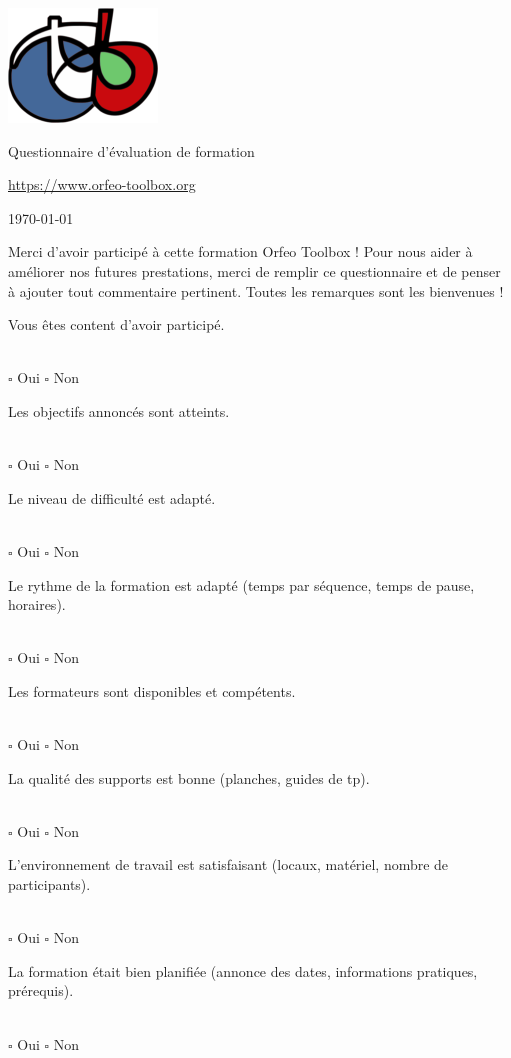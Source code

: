 \documentclass[10pt,a4paper]{article}
\begin{document}
\begin{center}
\includegraphics[scale=0.5]{Art/otb-logo.png}

Questionnaire d'évaluation de formation

{\small\url{https://www.orfeo-toolbox.org}}

\today
\end{center}

\begin{center}
\begin{minipage}{.8\textwidth}
Merci d'avoir participé à cette formation Orfeo Toolbox ! Pour nous aider à
améliorer nos futures prestations, merci de remplir ce questionnaire et de
penser à ajouter tout commentaire pertinent. Toutes les remarques sont les
bienvenues !
\end{minipage}
\end{center}

\newcommand{\answer}{
\\ \quad $\square$ Oui \quad $\square$ Non\\
\vspace{4em}
}

Vous êtes content d'avoir participé.
\answer

Les objectifs annoncés sont atteints.
\answer

Le niveau de difficulté est adapté.
\answer

Le rythme de la formation est adapté (temps par séquence, temps de pause,
horaires).
\answer

Les formateurs sont disponibles et compétents.
\answer

La qualité des supports est bonne (planches, guides de tp).
\answer

L'environnement de travail est satisfaisant (locaux, matériel, nombre de
participants).
\answer

La formation était bien planifiée (annonce des dates, informations pratiques,
prérequis).
\answer

\newcommand{\moduleanswer}{
\\
\begin{tabular}{rlll}  
  Difficulté:         & $\square$ Adaptée & $\square$ Difficile & $\square$
  Facile\\
  Temps alloué:       & $\square$ Adapté  & $\square$ Manque de temps pour tout
  faire & $\square$ Manque de choses à faire\\
  Qualité du support: & $\square$ Bonne & $\square$ À améliorer: & \\
  Commentaire: &&&\\
\end{tabular}
\vspace{4em}
}
\end{document}

